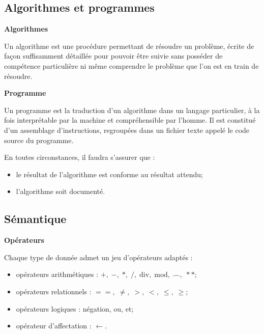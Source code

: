 \documentclass[10pt]{article}
\begin{document}
\subsection{Algorithmes et programmes \cite{wack}}
\begin{defi}
\textbf{Algorithmes}

Un algorithme est une procédure permettant de résoudre un problème, écrite de façon
suffisamment détaillée pour pouvoir être suivie sans posséder de compétence particulière
ni même comprendre le problème que l’on est en train de résoudre.
\end{defi}

\begin{defi}
\textbf{Programme}

Un programme est la traduction d’un algorithme dans un langage particulier,
à la fois interprétable par la machine et compréhensible par l’homme. Il est constitué
d’un assemblage d’instructions, regroupées dans un fichier texte appelé le code source du
programme.
\end{defi}

\begin{warn}
En toutes circonstances, il faudra s'assurer que : 
\begin{itemize}
\item le résultat de l'algorithme est conforme au résultat attendu;
\item l'algorithme soit documenté. 
\end{itemize}
\end{warn}

\subsection{Sémantique}

\begin{defi}
\textbf{Opérateurs}

Chaque type de donnée admet un jeu d’opérateurs adaptés :
\begin{itemize}
\item opérateurs arithmétiques : $+,\; -,\; *,\; /,\; \text{div},\; \text{mod},\; \hat\quad,\; **$;
\item opérateurs relationnels : $==,\; \neq,\; >,\;<,\; \leq,\; \geq$;
\item opérateurs logiques : négation, ou, et;
\item opérateur d'affectation : $\leftarrow$.
\end{itemize}
\end{defi}
\end{document}
